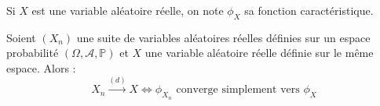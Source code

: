 




  \begin{notation}
    Si $X$ est une variable aléatoire réelle, on note $\phi_X$ sa fonction caractéristique.
  \end{notation}


  \begin{theorem}[Lévy]
    \label{theoreme-central-limite-1}
    Soient $(X_n)$ une suite de variables aléatoires réelles définies sur un espace probabilité $(\Omega, \mathcal{A}, \mathbb{P})$ et $X$ une variable aléatoire réelle définie sur le même espace. Alors :
    \[ X_n \overset{(d)}{\longrightarrow} X \iff \phi_{X_n} \text{ converge simplement vers } \phi_X \]
  \end{theorem}

